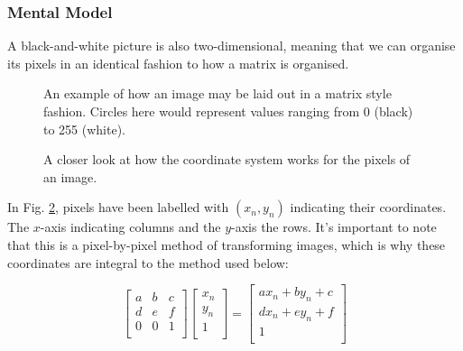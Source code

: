 \documentclass{article}
\begin{document}
\subsubsection{Mental Model} 

A black-and-white picture is also two-dimensional, meaning that we can organise its 
pixels in an identical fashion to how a matrix is organised.

\begin{figure}[!htbp]
    \centering
    \caption{An example of how an image may be laid out in a matrix style
    fashion. Circles here would represent values ranging from 0 (black) to 255
    (white).}
    \label{grid}
\end{figure}

\begin{figure}[!htbp]
    \centering
    \caption{A closer look at how the coordinate system works for the pixels of
    an image.}
    \label{pixels}
\end{figure}



In Fig. \ref{pixels}, pixels have been labelled with $ (x_n, y_n)  $ indicating
their coordinates. The $ x $-axis indicating columns and the $ y $-axis the
rows. It's important to note that this is a pixel-by-pixel method of transforming
images, which is why these coordinates are integral to the method used below:

\begin{equation}
    \begin{bmatrix}
        a & b & c \\
		d & e & f \\
		0 & 0 & 1 \\	
    \end{bmatrix}
    \begin{bmatrix}
        x_n  \\
		y_n  \\
		1 \\		
    \end{bmatrix}
    =
    \begin{bmatrix}
        ax_n  + by_n + c \\
		dx_n + ey_n  + f \\
		1 \\		    
    \end{bmatrix}
    \label{svg}
\end{equation}
\end{document}
